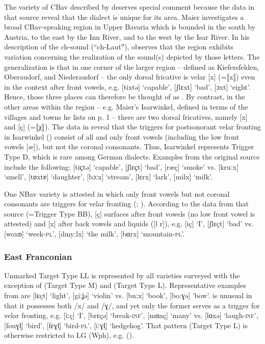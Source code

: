 The variety of CBav described by \citet{Maier1965} deserves special comment because the data in that source reveal that the dialect is unique for its area. Maier investigates a broad CBav-speaking region in Upper Bavaria which is bounded in the south by Austria, to the east by the Inn River, and to the west by the Isar River. In his description of the ch-sound (“ch-Lautˮ), \citet[4]{Maier1965} observes that the region exhibits variation concerning the realization of the sound(s) depicted by those letters. The generalization is that in one corner of the larger region -- defined as Kiefersfelden, Oberaudorf, and Niederaudorf -- the only dorsal fricative is velar [x] (=⟦x⟧) even in the context after front vowels, e.g. [tixtə] ‘capable’, [ʃlɛxt] ‘bad’, [ɔxt] ‘eight’. Hence, those three places can therefore be thought of as . By contrast, in the other areas within the region -- e.g. Maier’s Isarwinkel, defined in terms of the villages and towns he lists on p. 1 -- there are two dorsal fricatives, namely [x] and [ç] (=⟦χ⟧). The data in \citet{Maier1965} reveal that the triggers for postsonorant velar fronting in Isarwinkel () consist of all and only front vowels (including the low front vowels [æ]), but not the coronal consonants. Thus, Isarwinkel represents Trigger Type D, which is rare among German dialects. Examples from the original source include the following: [ti{ҫt{ə}] ‘capable’, [{ʃ}l{ɛ}ҫt] ‘bad’, [ræç] ‘smoke’ vs. [kru{ː}x] ‘smell’, [t{ɒ}xt{ɐ}] ‘daughter’,} [bɔːx] ‘stream’, [lɛrx] ‘lark’, [milx] ‘milk’.

One NBav variety is attested in which only front vowels but not coronal consonants are triggers for velar fronting (; \citealt{Seemüller1908b}). According to the data from that source (=Trigger Type BB), [ç] surfaces after front vowels (no low front vowel is attested) and [x] after back vowels and liquids ([l r]), e.g. [iç] ‘I’, [ʃlɛçt] ‘bad’ vs. [woxɒ] ‘week-\textsc{pl}’, [dmyːlx] ‘the milk’, [bɑrx] ‘mountain-\textsc{pl}’.

\subsubsection{East Franconian}
Unmarked Target Type LL is represented by all varieties surveyed with the exception of  (Target Type M) and  (Target Type L). Representative examples from  are [lɛçt] ‘light’, [giːʝə] ‘violin’ vs. [buːx] ‘book’, [boːɣə] 'bow'.  is unusual in that it possesses both /x/ and /ɣ/, and yet only the former serves as a trigger for velar fronting, e.g. [iːç] ‘I’, [brɛçə] ‘break\textsc{{}-inf}’, [mɑnç] ‘many’ vs. [lɑxə] ‘laugh-\textsc{inf}’, [fouɣl̩] ‘bird’, [fɛɣl̩] ‘bird-\textsc{pl}’, [iːɣl̩] ‘hedgehog’. That pattern (Target Type L) is otherwise restricted to LG (Wph), e.g.  ().

